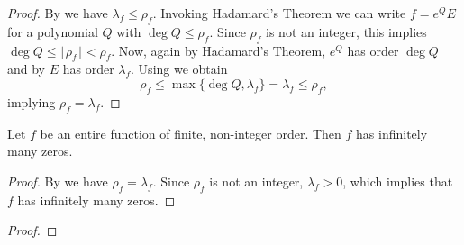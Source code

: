 \begin{proof}
    By  we have $\lambda_f \leq \rho_f$. Invoking Hadamard's Theorem we can write $f = e^Q E$ for a polynomial $Q$ with $\deg Q \leq \rho_f$. Since $\rho_f$ is not an integer, this implies $\deg Q \leq \lfloor \rho_f \rfloor < \rho_f$. Now, again by Hadamard's Theorem, $e^Q$ has order $\deg Q$ and by  $E$ has order $\lambda_f$. Using  we obtain
    $$ \rho_f \leq \max \{ \deg Q, \lambda_f \} = \lambda_f \leq \rho_f, $$
    implying $\rho_f = \lambda_f$.
\end{proof}

\begin{theorem} \label{thm:finite-non-integer-order-infinite-zeros}
    Let $f$ be an entire function of finite, non-integer order. Then $f$ has infinitely many zeros.
\end{theorem}

\begin{proof}
    By  we have $\rho_f = \lambda_f$. Since $\rho_f$ is not an integer, $\lambda_f > 0$, which implies that $f$ has infinitely many zeros.
\end{proof}


\begin{theorem}[Borel] \label{thm:existence-borel-exceptional-values}
\end{theorem}

\begin{proof}
\end{proof}